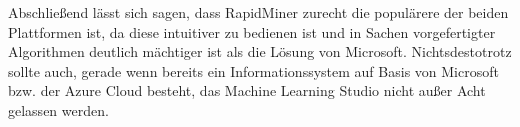 Abschließend lässt sich sagen, dass RapidMiner zurecht die populärere der
beiden Plattformen ist, da diese intuitiver zu bedienen ist und in Sachen
vorgefertigter Algorithmen deutlich mächtiger ist als die Lösung von Microsoft.
Nichtsdestotrotz sollte auch, gerade wenn bereits ein Informationssystem auf
Basis von Microsoft bzw. der Azure Cloud besteht, das Machine Learning Studio
nicht außer Acht gelassen werden.
